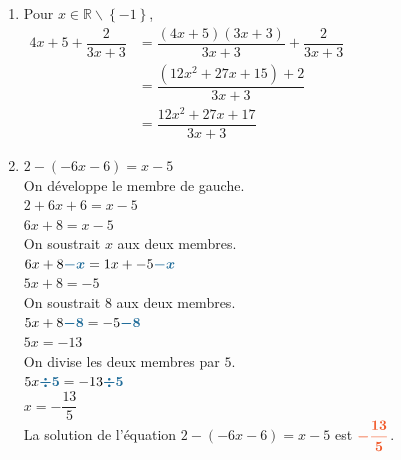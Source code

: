 \documentclass[a4paper,11pt]{article}
\begin{document}
\begin{seanceD}{}
\begin{enumerate}
\item Pour $x\in \mathbb{R}\smallsetminus\left\{-1\right\}$, \\
            $\begin{aligned}
            4x+5+\dfrac{2}{3x+3}
           & = \dfrac{(4x+5)(3x+3)}{3x+3}+\dfrac{2}{3x+3}\\
            &=\dfrac{(12x^2+27x+15)+2}{3x+3}\\
           & =\dfrac{12x^2+27x+17}{3x+3}
           \end{aligned}$
\item $2-(-6x-6)=x-5$\\On développe le membre de gauche.\\$2+6x+6=x-5$\\$6x+8=x-5$\\On soustrait $x$ aux deux membres.\\$6x+8{\color[HTML]{216D9A}\boldsymbol{-x}}=1x+-5{\color[HTML]{216D9A}\boldsymbol{-x}}$\\$5x+8=-5$\\On soustrait $8$ aux deux membres.\\$5x+8{\color[HTML]{216D9A}\boldsymbol{-8}}=-5{\color[HTML]{216D9A}\boldsymbol{-8}}$\\$5x=-13$\\On divise les deux membres par $5$.\\$5x{\color[HTML]{216D9A}\boldsymbol{\div5}}=-13{\color[HTML]{216D9A}\boldsymbol{\div5}}$\\$x=-\dfrac{13}{5}$\\La solution de l'équation $2-(-6x-6)=x-5$ est ${\color[HTML]{f15929}\boldsymbol{-\dfrac{13}{5}}}$.
\end{enumerate}
\end{seanceD}
\end{document}
